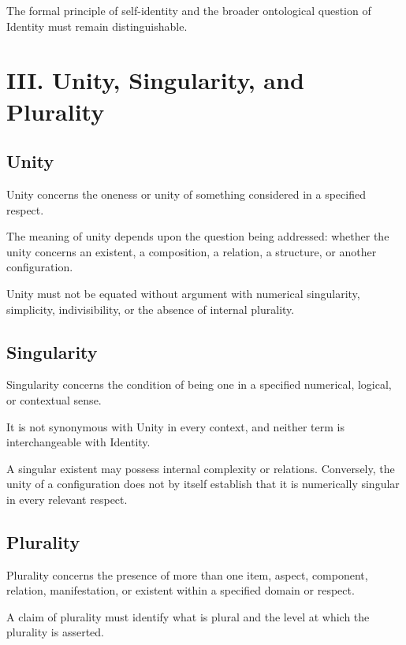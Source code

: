 The formal principle of self-identity and the broader ontological
question of Identity must remain distinguishable.



\section*{III. Unity, Singularity, and Plurality}


\subsection*{Unity}

Unity concerns the oneness or unity of something considered in a
specified respect.

The meaning of unity depends upon the question being addressed:
whether the unity concerns an existent, a composition, a relation,
a structure, or another configuration.

Unity must not be equated without argument with numerical singularity,
simplicity, indivisibility, or the absence of internal plurality.


\subsection*{Singularity}

Singularity concerns the condition of being one in a specified numerical,
logical, or contextual sense.

It is not synonymous with Unity in every context, and neither term
is interchangeable with Identity.

A singular existent may possess internal complexity or relations.
Conversely, the unity of a configuration does not by itself establish
that it is numerically singular in every relevant respect.


\subsection*{Plurality}

Plurality concerns the presence of more than one item, aspect, component,
relation, manifestation, or existent within a specified domain or respect.

A claim of plurality must identify what is plural and the level at which
the plurality is asserted.

